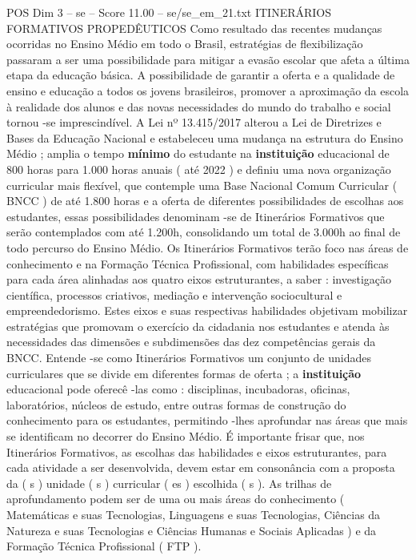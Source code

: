 \begin{textsample}{POS Dim 3 – se – Score 11.00 – se/se\_em\_21.txt}  \label{ex:f3_pos_169}
ITINERÁRIOS FORMATIVOS PROPEDÊUTICOS Como resultado das recentes mudanças ocorridas no Ensino Médio em todo o Brasil, estratégias de flexibilização passaram a ser uma possibilidade para mitigar a evasão escolar que afeta a última etapa da educação básica.
A possibilidade de garantir a oferta e a qualidade de ensino e educação a todos os jovens brasileiros, promover a aproximação da escola à realidade dos alunos e das novas necessidades do mundo do trabalho e social tornou -se imprescindível.
A Lei nº 13.415/2017 alterou a Lei de Diretrizes e Bases da Educação Nacional e estabeleceu uma mudança na estrutura do Ensino Médio ; amplia o tempo \textbf{mínimo} do estudante na \textbf{instituição} educacional de 800 horas para 1.000 horas anuais ( até 2022 ) e definiu uma nova organização curricular mais flexível, que contemple uma Base Nacional Comum Curricular ( BNCC ) de até 1.800 horas e a oferta de diferentes possibilidades de escolhas aos estudantes, essas possibilidades denominam -se de Itinerários Formativos que serão contemplados com até 1.200h, consolidando um total de 3.000h ao final de todo percurso do Ensino Médio.
Os Itinerários Formativos terão foco nas áreas de conhecimento e na Formação Técnica Profissional, com habilidades específicas para cada área alinhadas aos quatro eixos estruturantes, a saber : investigação científica, processos criativos, mediação e intervenção sociocultural e empreendedorismo.
Estes eixos e suas respectivas habilidades objetivam mobilizar estratégias que promovam o exercício da cidadania nos estudantes e atenda às necessidades das dimensões e subdimensões das dez competências gerais da BNCC.
Entende -se como Itinerários Formativos um conjunto de unidades curriculares que se divide em diferentes formas de oferta ; a \textbf{instituição} educacional pode oferecê -las como : disciplinas, incubadoras, oficinas, laboratórios, núcleos de estudo, entre outras formas de construção do conhecimento para os estudantes, permitindo -lhes aprofundar nas áreas que mais se identificam no decorrer do Ensino Médio.
É importante frisar que, nos Itinerários Formativos, as escolhas das habilidades e eixos estruturantes, para cada atividade a ser desenvolvida, devem estar em consonância com a proposta da ( s ) unidade ( s ) curricular ( es ) escolhida ( s ).
As trilhas de aprofundamento podem ser de uma ou mais áreas do conhecimento ( Matemáticas e suas Tecnologias, Linguagens e suas Tecnologias, Ciências da Natureza e suas Tecnologias e Ciências Humanas e Sociais Aplicadas ) e da Formação Técnica Profissional ( FTP ).

\end{textsample}
